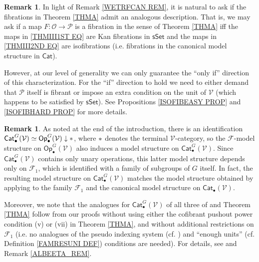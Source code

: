 \documentclass[a4paper,10pt
 ,final
]{article}%
\numberwithin{equation}{section}
\numberwithin{figure}{section}
\theoremstyle{definition} %
\newtheorem{remark}[equation]{Remark}%
\newcommand{\Cat}{\mathsf{Cat}}
\newcommand{\Op}{\mathsf{Op}}%
\newcommand{\F}{\ensuremath{\mathcal F}}
\newcommand{\V}{\ensuremath{\mathcal V}}
\renewcommand{\O}{\ensuremath{\mathcal O}}
\renewcommand{\P}{\ensuremath{\mathcal P}}
\newcommand{\1}{\ensuremath{\mathbbm 1}}%
\begin{document}
\begin{remark}\label{FIBSALT REM}
	In light of Remark \ref{WETRFCAN REM}, 
	it is natural to ask if the fibrations in Theorem \ref{THMA}
	admit an analogous description.
	That is, we may ask if a map $F\colon \O \to \mathcal{P}$
	is a fibration in the sense of Theorem \ref{THMA}
	iff the maps in 
	\eqref{THMIII1ST EQ}
	are Kan fibrations in $\mathsf{sSet}$
	and the maps in
	\eqref{THMIII2ND EQ}
	are isofibrations (i.e. fibrations in the canonical model structure in $\mathsf{Cat}$).
	
	However, at our level of generality we can only guarantee the 
	``only if'' direction of this characterization.
	For the ``if'' direction to hold we need to either demand
	that $\P$ itself is fibrant or
	impose an extra condition on the unit of $\V$ (which happens to be satisfied by $\mathsf{sSet}$).
	See Propositions \ref{ISOFIBEASY PROP} and \ref{ISOFIBHARD PROP} for more details.
\end{remark}














\begin{remark}\label{RESTTOCATS REM}
	As noted at the end of the introduction, 
	there is an identification
	$\Cat_\bullet^G(\V) \simeq \Op_\bullet^G(\V) \downarrow \**$,
	where $\**$ denotes the terminal $\V$-category,
	so the $\F$-model structure on $\Op_\bullet^G(\V)$
	also induces a model structure on $\Cat_\bullet^G(\V)$.
	Since $\Cat_\bullet^G(\V)$ contains only unary operations,
	this latter model structure depends only on $\F_1$,
	which is identified with a family of subgroups of $G$ itself.
	In fact, the resulting model structure on 
	$\Cat_\bullet^G(\V)$ matches the model structure 
	obtained by applying \cite{Ste16}
	to the family $\F_1$ and the canonical model structure on
	$\Cat_\bullet(\V)$.
	

	Moreover, we note that the analogues for $\Cat_\bullet^G(\V)$
	of all three of \cite[Thms. \ref{OC-THMI} and \ref{OC-THMII}]{BP_FCOP} and Theorem \ref{THMA}
	follow from our proofs without using either
	the cofibrant pushout power condition (v)
	or (vii) in Theorem \ref{THMA},
	and without additional restrictions on $\F_1$
	(i.e. no analogues of the  pseudo indexing system
	(cf. \cite[Thm. \ref{OC-THMII}]{BP_FCOP})
	and ``enough units'' (cf. Definition \ref{FAMRESUNI DEF})
	conditions are needed).
	For details, see \cite[Rem. \ref{OC-CSPNTHI REM}]{BP_FCOP} and
	Remark \ref{ALBEETA_REM}.
\end{remark}
\end{document}
